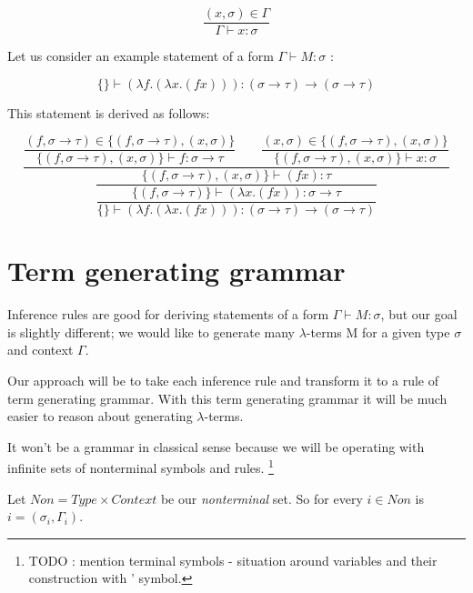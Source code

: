 \documentclass[12pt,a4paper]{report}
\begin{document}
	\begin{equation*}
		\frac{( x , \sigma )  \in \Gamma}
		     {\Gamma \vdash x : \sigma}
	\end{equation*}	
	
	Let us consider an example statement of a form $\Gamma \vdash M : \sigma$ :
	
	\[
		\{\} \vdash (\lambda f . (\lambda x . (f x) )) : 
		(\sigma \rightarrow \tau) \rightarrow ( \sigma \rightarrow \tau ) 
	\]
		
	This statement is derived as follows: 
	
	\begin{equation*}
	\dfrac{
		\dfrac{ (f,\sigma \rightarrow \tau) \in \{ (f,\sigma \rightarrow \tau) , (x,\sigma)  \}  }
		     { \{ (f,\sigma \rightarrow \tau) , (x,\sigma)  \} \vdash f : \sigma \rightarrow \tau }
		\qquad
		\dfrac{ (x,\sigma) \in \{ (f,\sigma \rightarrow \tau) , (x,\sigma)  \}  }
		     { \{ (f,\sigma \rightarrow \tau) , (x,\sigma)  \} \vdash x : \sigma }
		 }
		 {
			\dfrac{		 	
		 		\{ (f,\sigma \rightarrow \tau) , (x,\sigma)  \} \vdash (f x) : \tau
		 	}{
				\dfrac{\{ (f,\sigma \rightarrow \tau) \} \vdash (\lambda x . (f x) ) : 
				\sigma \rightarrow \tau}
				{ \{ \} \vdash (\lambda f . (\lambda x . (f x) ) ) 
				  : (\sigma \rightarrow \tau) \rightarrow (\sigma \rightarrow \tau) }
		 	}
		 }
	\end{equation*}		
	
\section{Term generating grammar}

Inference rules are good for deriving statements of a form $\Gamma \vdash M : \sigma$, but our
goal is slightly different; we would like to generate many $\lambda$-terms M for a given type 
$\sigma$ and context $\Gamma$.

Our approach will be to take each inference rule and transform it to a rule of term generating
grammar. With this term generating grammar it will be much easier to reason about generating 
$\lambda$-terms.
	
It won't be a grammar in classical sense because we will be operating with infinite sets of
nonterminal symbols and rules. \footnote{TODO : mention terminal symbols - situation around 
variables and their construction with ' symbol.}

Let $Non = Type \times Context $ be our {\it nonterminal} set. 
So for every $i \in Non$ is $i = (\sigma_i , \Gamma_i )$.
\end{document}

